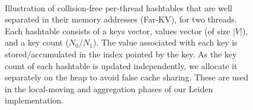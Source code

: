 \begin{figure}[hbtp]
  \centering
   \\[-2ex]
  \caption{Illustration of collision-free per-thread hashtables that are well separated in their memory addresses (Far-KV), for two threads. Each hashtable consists of a keys vector, values vector (of size $|V|$), and a key count ($N_0$/$N_1$). The value associated with each key is stored/accumulated in the index pointed by the key. As the key count of each hashtable is updated independently, we allocate it separately on the heap to avoid false cache sharing. These are used in the local-moving and aggregation phases of our Leiden implementation.}
  \label{fig:leiden-hashtable}
\end{figure}

